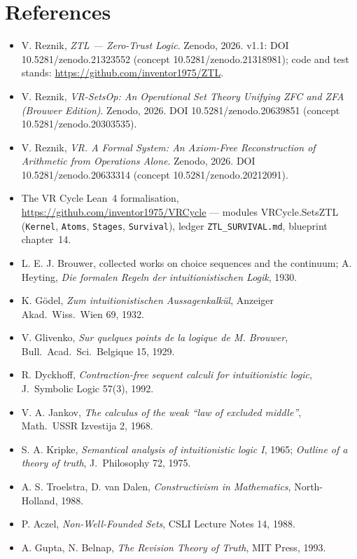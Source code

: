 \documentclass[11pt]{article}
\theoremstyle{remark}
\begin{document}
\section*{References}
\begin{itemize}
\item[{[1]}] V. Reznik, \emph{ZTL --- Zero-Trust Logic}. Zenodo, 2026. v1.1:
DOI 10.5281/zenodo.21323552 (concept 10.5281/zenodo.21318981); code and
test stands: \url{https://github.com/inventor1975/ZTL}.
\item[{[2]}] V. Reznik, \emph{VR-SetsOp: An Operational Set Theory Unifying
ZFC and ZFA (Brouwer Edition)}. Zenodo, 2026. DOI 10.5281/zenodo.20639851
(concept 10.5281/zenodo.20303535).
\item[{[3]}] V. Reznik, \emph{VR. A Formal System: An Axiom-Free
Reconstruction of Arithmetic from Operations Alone}. Zenodo, 2026. DOI
10.5281/zenodo.20633314 (concept 10.5281/zenodo.20212091).
\item[{[4]}] The VR Cycle Lean~4 formalisation,
\url{https://github.com/inventor1975/VRCycle} --- modules
\textsf{VRCycle.SetsZTL} (\texttt{Kernel}, \texttt{Atoms},
\texttt{Stages}, \texttt{Survival}), ledger \texttt{ZTL\_SURVIVAL.md},
blueprint chapter~14.
\item[{[5]}] L. E. J. Brouwer, collected works on choice sequences and the
continuum; A. Heyting, \emph{Die formalen Regeln der intuitionistischen
Logik}, 1930.
\item[{[6]}] K. G\"odel, \emph{Zum intuitionistischen Aussagenkalk\"ul},
Anzeiger Akad.\ Wiss.\ Wien 69, 1932.
\item[{[7]}] V. Glivenko, \emph{Sur quelques points de la logique de M.
Brouwer}, Bull.\ Acad.\ Sci.\ Belgique 15, 1929.
\item[{[8]}] R. Dyckhoff, \emph{Contraction-free sequent calculi for
intuitionistic logic}, J.\ Symbolic Logic 57(3), 1992.
\item[{[9]}] V. A. Jankov, \emph{The calculus of the weak ``law of excluded
middle''}, Math.\ USSR Izvestija 2, 1968.
\item[{[10]}] S. A. Kripke, \emph{Semantical analysis of intuitionistic
logic I}, 1965; \emph{Outline of a theory of truth}, J.\ Philosophy 72,
1975.
\item[{[11]}] A. S. Troelstra, D. van Dalen, \emph{Constructivism in
Mathematics}, North-Holland, 1988.
\item[{[12]}] P. Aczel, \emph{Non-Well-Founded Sets}, CSLI Lecture Notes
14, 1988.
\item[{[13]}] A. Gupta, N. Belnap, \emph{The Revision Theory of Truth},
MIT Press, 1993.
\end{itemize}
\end{document}
